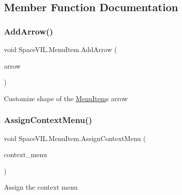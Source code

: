\subsection{Member Function Documentation}
\mbox{\label{class_space_v_i_l_1_1_menu_item_a54c3c774c9108d3bd599b4e464f7fcd1}} 
\subsubsection{\texorpdfstring{Add\+Arrow()}{AddArrow()}}
{\footnotesize\ttfamily void Space\+V\+I\+L.\+Menu\+Item.\+Add\+Arrow (\begin{DoxyParamCaption}\item[{\mbox{\hyperlink{class_space_v_i_l_1_1_custom_shape}{Custom\+Shape}}}]{arrow }\end{DoxyParamCaption})\hspace{0.3cm}{\ttfamily [inline]}}



Customize shape of the \mbox{\hyperlink{class_space_v_i_l_1_1_menu_item}{Menu\+Item}}\textquotesingle{}s arrow 

\mbox{\label{class_space_v_i_l_1_1_menu_item_a1525b3cbf3eda9f35e9ad993326512be}} 
\subsubsection{\texorpdfstring{Assign\+Context\+Menu()}{AssignContextMenu()}}
{\footnotesize\ttfamily void Space\+V\+I\+L.\+Menu\+Item.\+Assign\+Context\+Menu (\begin{DoxyParamCaption}\item[{\mbox{\hyperlink{class_space_v_i_l_1_1_context_menu}{Context\+Menu}}}]{context\+\_\+menu }\end{DoxyParamCaption})\hspace{0.3cm}{\ttfamily [inline]}}



Assign the context menu 

